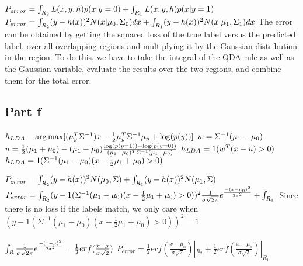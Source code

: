 \documentclass[paper=a4, fontsize=11pt]{scrartcl} %
\numberwithin{equation}{section} %
\numberwithin{figure}{section} %
\numberwithin{table}{section} %
\begin{document}
	$P_{error} = \int_{R_2}L(x,y,h)p(x|y=0) + \int_{R_1}L(x,y,h)p(x|y=1)\\\\$
	$P_{error} = \int_{R_2}(y-h(x))^2N(x|\mu_0, \Sigma_0)dx + \int_{R_1}(y-h(x))^2N(x|\mu_1, \Sigma_1)dx\\\\$
	The error can be obtained by getting the squared loss of the true label versus the predicted label, over all overlapping regions and multiplying it by the Gaussian distribution in the region. To do this, we have to take the integral of the QDA rule as well as the Gaussian variable, evaluate the results over the two regions, and combine them for the total error.
	
	\subsection{Part f}
	$h_{LDA} - \arg\max[(\mu_y^T\Sigma^{-1})x - \frac{1}{2}\mu_y^T\Sigma^{-1}\mu_y + \log(p(y))]\\\\\\$
	$w = \Sigma^{-1}(\mu_1-\mu_0)\\\\$
	$u = \frac{1}{2}(\mu_1 + \mu_0) - (\mu_1-\mu_0)\frac{\log(p(y=1)) - \log(p(y=0))}{(\mu_1-\mu_0)^T\Sigma^{-1}(\mu_1-\mu_0)}\\\\\\$
	$h_{LDA} = 1(w^T(x-u)>0)\\\\$
	$h_{LDA} = 1(\Sigma^{-1}(\mu_1-\mu_0)(x-\frac{1}{2}\mu_1+\mu_0) > 0)\\\\\\\\$
	
	$P_{error} = \int_{R_2}(y-h(x))^2N(\mu_0, \Sigma) + \int_{R_1} (y-h(x))^2N(\mu_1, \Sigma)\\\\$
	$P_{error} = \int_{R_2} (y-1(\Sigma^{-1}(\mu_1-\mu_0)(x-\frac{1}{2}\mu_1+\mu_0)>0))^2\frac{1}{\sigma\sqrt{2\pi}}e^{\frac{-(x-\mu_0)^2}{2\sigma^2}} + \int_{R_1}\\\\$
	Since there is no loss if the labels match, we only care when $(y-1(\Sigma^{-1}(\mu_1-\mu_0)(x-\frac{1}{2}\mu_1+\mu_0)>0))^2 = 1$\\\\
	$\int_R\frac{1}{\sigma\sqrt{2\pi}}e^{\frac{-(x-\mu)^2}{2\sigma^2}} = \frac{1}{2}erf(\frac{x-\mu}{\sigma\sqrt{2}})\\\\$
	$P_{error} = \frac{1}{2}erf(\frac{x-\mu_0}{\sigma\sqrt{2}})|_{R_2} + \frac{1}{2}erf(\frac{x-\mu_1}{\sigma\sqrt{2}})|_{R_1}$
	
\end{document}
